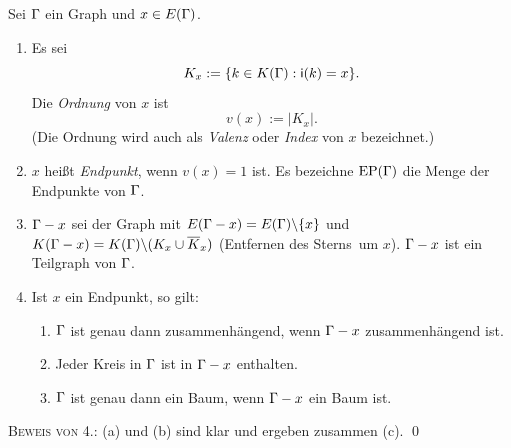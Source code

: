 \documentclass[a4paper, 12pt, twoside]{article}
\begin{document}
\DB Sei $\Gamma$ ein Graph und $x\in E(\Gamma)$.
\begin{enumerate}
\item Es sei
\[
K_x := \{ k\in K(\Gamma) : \mathsf{i}(k)=x \}.
\]
Die \emph{Ordnung} von $x$ ist
\[
v(x) := |K_x|.
\]
(Die Ordnung wird auch als \emph{Valenz}
oder \emph{Index}  von
$x$ bezeichnet.)
\item $x$ heißt \emph{Endpunkt}, wenn $v(x)=1$ ist.
Es bezeichne $\mathrm{EP}(\Gamma)$ die Menge der Endpunkte von $\Gamma$.
\item $\Gamma-x$ sei der Graph mit $E(\Gamma-x)=E(\Gamma)\backslash\{x\}$
und $K(\Gamma-x)=K(\Gamma)\backslash(K_x\cup \overline{K}_x)$
(Entfernen des \glqq Sterns\grqq\ um $x$). $\Gamma-x$ ist ein Teilgraph
von $\Gamma$.
\item Ist $x$ ein Endpunkt, so gilt:
\begin{enumerate}
	\item $\Gamma$ ist genau dann zusammenhängend, wenn $\Gamma-x$
	zusammenhängend ist.
	\item Jeder Kreis in $\Gamma$ ist in $\Gamma-x$ enthalten.
	\item $\Gamma$ ist genau dann ein Baum, wenn $\Gamma-x$ ein Baum ist.
\end{enumerate}
\end{enumerate}
\textsc{Beweis von 4.:} (a) und (b) sind klar und ergeben
zusammen (c).
\qed
\end{document}
